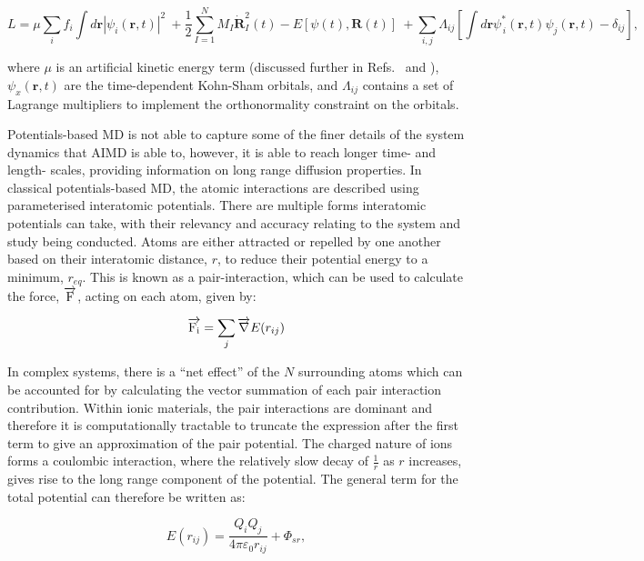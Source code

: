 \documentclass[../main.tex]{subfiles}
\begin{document}
\begin{equation}
    L=\mu \sum_i f_i \int d\textbf{r}|\psi_i(\textbf{r},t)|^2 \
    +\frac{1}{2}\sum^N_{I=1} M_I\dot{\textbf{R}}^2_I (t)- E\left[{\psi(t)}, \textbf{R}(t)\right] \
    +\sum_{i,j} \Lambda_{ij}\left[\int d\textbf{r}\psi^*_{\,i}(\textbf{r},t)\psi_j(\textbf{r}, t)- \delta_{ij}\right],
\end{equation}

where $\mu$ is an artificial kinetic energy term (discussed further in Refs.~ and ), $\psi_x(\textbf{r},t)$ are the time-dependent Kohn-Sham orbitals, and $\Lambda_{ij}$ contains a set of Lagrange multipliers to implement the orthonormality constraint on the orbitals. 

Potentials-based MD is not able to capture some of the finer details of the system dynamics that AIMD is able to, however, it is able to reach longer time- and length- scales, providing information on long range diffusion properties. In classical potentials-based MD, the atomic interactions are described using parameterised interatomic potentials. There are multiple forms interatomic potentials can take, with their relevancy and accuracy relating to the system and study being conducted. Atoms are either attracted or repelled by one another based on their interatomic distance, $r$, to reduce their potential energy to a minimum, $r_{eq}$. This is known as a pair-interaction, which can be used to calculate the force, $\overrightarrow{\rm F}$, acting on each atom, given by:

\begin{equation}
    \overrightarrow{\rm F_i} = \sum_j {\overrightarrow{\nabla}}E(r_{ij})
\end{equation}

In complex systems, there is a ``net effect'' of the $N$ surrounding atoms which can be accounted for by calculating the vector summation of each pair interaction contribution. Within ionic materials, the pair interactions are dominant and therefore it is computationally tractable to truncate the expression after the first term \cite{harding_computer_1990} to give an approximation of the pair potential. The charged nature of ions forms a coulombic interaction, where the relatively slow decay of $\frac{1}{r}$ as $r$ increases, gives rise to the long range component of the potential. The general term for the total potential can therefore be written as:

\begin{equation}
    E(r_{ij}) = \frac{Q_i Q_j}{4\pi \varepsilon_0 r_{ij}} + \Phi_{sr},
\end{equation}
\end{document}

